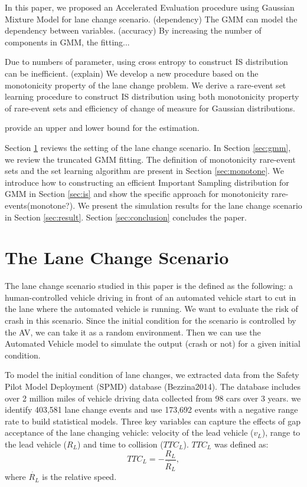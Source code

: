 \documentclass[conference]{IEEEtran}
\begin{document}
In this paper, we proposed an Accelerated Evaluation procedure using Gaussian Mixture Model for lane change scenario. (dependency) The GMM can model the dependency between variables. (accuracy) By increasing the number of components in GMM, the fitting...

Due to numbers of parameter, using cross entropy to construct IS distribution can be inefficient. (explain) We develop a new procedure based on the monotonicity property of the lane change problem. We derive a rare-event set learning procedure to construct IS distribution using both monotonicity property of rare-event sets and efficiency of change of measure for Gaussian distributions.

provide an upper and lower bound for the estimation.

Section \ref{sec:lane} reviews the setting of the lane change scenario. In Section \ref{sec:gmm}, we review the truncated GMM fitting. The definition of monotonicity rare-event sets and the set learning algorithm are present in Section \ref{sec:monotone}. We introduce how to constructing an efficient Important Sampling distribution for GMM in Section \ref{sec:is} and show the specific approach for monotonicity rare-events(monotone?). We present the simulation results for the lane change scenario in Section \ref{sec:result}. Section \ref{sec:conclusion} concludes the paper.

\section{The Lane Change Scenario}\label{sec:lane}

The lane change scenario studied in this paper is the defined as the following: a human-controlled vehicle driving in front of an automated vehicle start to cut in the lane where the automated vehicle is running. We want to evaluate the risk of crash in this scenario. Since the initial condition for the scenario is controlled by the AV, we can take it as a random environment. Then we can use the Automated Vehicle model to simulate the output (crash or not) for a given initial condition.

To model the initial condition of lane changes, we extracted data from the Safety Pilot Model Deployment (SPMD) database (Bezzina2014). The database includes over 2 million miles of vehicle driving data collected from 98 cars over 3 years. we identify 403,581 lane change events and use 173,692 events with a negative range rate to build statistical models. Three key variables can capture the effects of gap acceptance of the lane changing vehicle: velocity of the lead vehicle ($v_L$), range to the lead vehicle ($R_L$) and time to collision ($TTC_L$). $TTC_L$ was defined as:
\begin{equation}
	TTC_L=- \frac{R_L}{\dot{R_L}},
\end{equation}
where $\dot{R_L}$ is the relative speed.  
\end{document}
